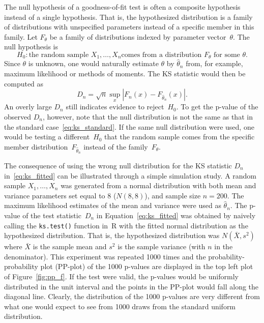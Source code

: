 \documentclass[12pt, letterpaper]{article}
\begin{document}
The null hypothesis of a goodness-of-fit test is often a composite hypothesis
instead of a single hypothesis. That is, the hypothesized distribution is a
family of distributions with unspecified parameters instead of a specific member
in this family. Let $F_\theta$ be a family of distributions indexed by parameter
vector~$\theta$. The null hypothesis is
\[
  H_0: \text{the random sample $X_1, \ldots, X_n$
    comes from a distribution $F_\theta$ for some $\theta$.}
\]
Since $\theta$ is unknown, one would naturally estimate $\theta$ by
$\hat\theta_n$ from, for example, maximum likelihood or methods of moments. The
KS statistic would then be computed as
\begin{equation}
  \label{eq:ks_fitted}
  D_n = \sqrt{n} \sup_x | F_n(x) - F_{\hat\theta_n}(x) |.
\end{equation}
An overly large $D_n$ still indicates evidence to reject~$H_0$. To get the
p-value of the observed $D_n$, however, note that the null distribution is not
the same as that in the standard
case~\eqref{eq:ks_standard}. If the same null distribution were used, one would
be testing a different~$H_0$ that the random sample comes from the specific
member distribution~$F_{\hat\theta_n}$ instead of the family~$F_\theta$.


The consequence of using the wrong null distribution for the KS statistic $D_n$
in~\eqref{eq:ks_fitted} can be illustrated through a simple simulation study. A
random sample $X_1, \ldots, X_n$ was generated from a normal
distribution with both mean and variance parameters set equal to 8 ($N(8,8)$), 
and sample size $n = 200$. The maximum likelihood estimates of the mean and 
variance were used as $\hat\theta_n$. The p-value of the test
statistic~$D_n$ in Equation~\eqref{eq:ks_fitted} was obtained by naively calling 
the \texttt{ks.test()} function in~R with the fitted normal distribution as the
hypothesized distribution. That is, the hypothesized distribution was
$N(\bar X, s^2)$ where $\bar X$ is the sample mean and $s^2$ is the sample
variance (with $n$ in the denominator). This experiment was repeated 1000 times
and the probability-probability plot (PP-plot) of the 1000 p-values are 
displayed in the top left plot of Figure~\ref{fig:pp_f}. If the test were
valid, the p-values would be uniformly distributed in the unit
interval and the points in the PP-plot would fall along the diagonal line. 
Clearly, the distribution of the 1000 p-values are very different from what
one would expect to see from 1000 draws from the standard uniform
distribution.  
\end{document}
